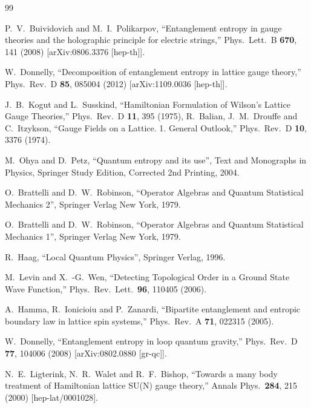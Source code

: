 \documentclass[12pt,a4paper]{article}
\begin{document}
\begin{thebibliography}{99}
 
 P.~V.~Buividovich and M.~I.~Polikarpov,
  ``Entanglement entropy in gauge theories and the holographic principle for electric strings,''
  Phys.\ Lett.\ B {\bf 670}, 141 (2008)
  [arXiv:0806.3376 [hep-th]].
  
 W.~Donnelly,
  ``Decomposition of entanglement entropy in lattice gauge theory,''
  Phys.\ Rev.\ D {\bf 85}, 085004 (2012)
  [arXiv:1109.0036 [hep-th]].


  J.~B.~Kogut and L.~Susskind,
  ``Hamiltonian Formulation of Wilson's Lattice Gauge Theories,''
  Phys.\ Rev.\ D {\bf 11}, 395 (1975),
  R.~Balian, J.~M.~Drouffe and C.~Itzykson,
  ``Gauge Fields on a Lattice. 1. General Outlook,''
  Phys.\ Rev.\ D {\bf 10}, 3376 (1974).


M.~Ohya and D.~Petz, ``Quantum entropy and its use'', Text and Monographs in Physics, Springer Study Edition, 
Corrected 2nd Printing, 2004. 

 O.~Brattelli and D.~W.~Robinson, ``Operator Algebras and Quantum Statistical Mechanics 2'', Springer Verlag New York, 1979.

 O.~Brattelli and D.~W.~Robinson, ``Operator Algebras and Quantum Statistical Mechanics 1'', Springer Verlag New York, 1979.

 R.~Haag, ``Local Quantum Physics'', Springer Verlag, 1996.

  M.~Levin and X.~-G.~Wen,
   ``Detecting Topological Order in a Ground State Wave Function,''
  Phys.\ Rev.\ Lett.\  {\bf 96}, 110405 (2006).

 A.~Hamma, R.~Ionicioiu and P.~Zanardi,
  ``Bipartite entanglement and entropic boundary law in lattice spin systems,''
  Phys.\ Rev.\ A {\bf 71}, 022315 (2005).

  W.~Donnelly,
  ``Entanglement entropy in loop quantum gravity,''
  Phys.\ Rev.\ D {\bf 77}, 104006 (2008)
  [arXiv:0802.0880 [gr-qc]].
  
 N.~E.~Ligterink, N.~R.~Walet and R.~F.~Bishop,
  ``Towards a many body treatment of Hamiltonian lattice SU(N) gauge theory,''
  Annals Phys.\  {\bf 284}, 215 (2000)
  [hep-lat/0001028].
  

\end{thebibliography}
\end{document}
